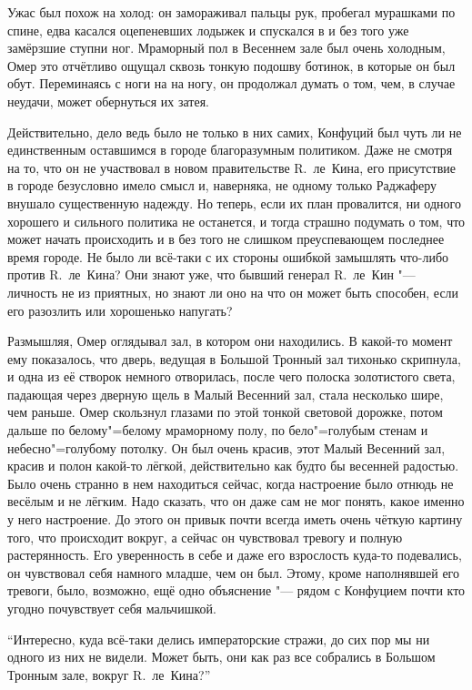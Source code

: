 Ужас был похож на холод: он замораживал пальцы рук, пробегал мурашками по спине,
едва касался оцепеневших лодыжек и спускался в и без того уже замёрзшие ступни
ног.
Мраморный пол в Весеннем зале был очень холодным, Омер это отчётливо ощущал
сквозь тонкую подошву ботинок, в которые он был обут.
Переминаясь с ноги на на ногу, он продолжал думать о том, чем, в случае неудачи,
может обернуться их затея.

Действительно, дело ведь было не только в них самих, Конфуций был чуть ли не
единственным оставшимся в городе благоразумным политиком.
Даже не смотря на то, что он не участвовал в новом правительстве R.~ле~Кина,
его присутствие в городе безусловно имело смысл и, наверняка, не одному только
Раджаферу внушало существенную надежду.
Но теперь, если их план провалится, ни одного хорошего и сильного политика не
останется, и тогда страшно подумать о том, что может начать происходить и в без
того не слишком преуспевающем последнее время городе.
Не было ли всё-таки с их стороны ошибкой замышлять что-либо против R.~ле~Кина?
Они знают уже, что бывший генерал R.~ле~Кин "--- личность не из приятных, но
знают ли оно на что он может быть способен, если его разозлить или хорошенько
напугать?

Размышляя, Омер оглядывал зал, в котором они находились.
В какой-то момент ему показалось, что дверь, ведущая в Большой Тронный зал
тихонько скрипнула, и одна из её створок немного отворилась, после чего полоска
золотистого света, падающая через дверную щель в Малый Весенний зал, стала
несколько шире, чем раньше.
Омер скользнул глазами по этой тонкой световой дорожке, потом дальше по
белому"=белому мраморному полу, по бело"=голубым стенам и небесно"=голубому
потолку.
Он был очень красив, этот Малый Весенний зал, красив и полон какой-то лёгкой,
действительно как будто бы весенней радостью.
Было очень странно в нем находиться сейчас, когда настроение было отнюдь не
весёлым и не лёгким.
Надо сказать, что он даже сам не мог понять, какое именно у него настроение.
До этого он привык почти всегда иметь очень чёткую картину того, что происходит
вокруг, а сейчас он чувствовал тревогу и полную растерянность.
Его уверенность в себе и даже его взрослость куда-то подевались, он чувствовал
себя намного младше, чем он был.
Этому, кроме наполнявшей его тревоги, было, возможно, ещё одно объяснение "---
рядом с Конфуцием почти кто угодно почувствует себя мальчишкой.

\enquote{Интересно, куда всё-таки делись императорские стражи, до сих пор мы ни
одного из них не видели.
Может быть, они как раз все собрались в Большом Тронным зале, вокруг R.~ле~Кина?}

